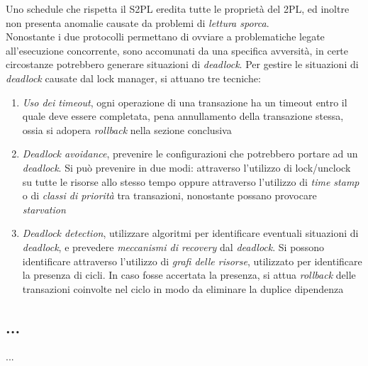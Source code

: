 \documentclass{article}
\begin{document}
Uno schedule che rispetta il S2PL eredita tutte le proprietà del 2PL, ed inoltre non presenta anomalie causate da problemi di \textit{lettura sporca}.\vspace{14pt}\\
Nonostante i due protocolli permettano di ovviare a problematiche legate all'esecuzione concorrente, sono accomunati da una specifica avversità, in certe circostanze potrebbero generare situazioni di \textit{deadlock}. Per gestire le situazioni di \textit{deadlock} causate dal lock manager, si attuano tre tecniche:
\begin{enumerate}[label={-}]
    \item \textit{Uso dei timeout}, ogni operazione di una transazione ha un timeout entro il quale deve essere completata, pena annullamento della transazione stessa, ossia si adopera \textit{rollback} nella sezione conclusiva
    \item \textit{Deadlock avoidance}, prevenire le configurazioni che potrebbero portare ad un \textit{deadlock}. Si può prevenire in due modi: attraverso l'utilizzo di lock/unclock su tutte le risorse allo stesso tempo oppure attraverso l'utilizzo di \textit{time stamp} o di \textit{classi di priorità} tra transazioni, nonostante possano provocare \textit{starvation}
    \item \textit{Deadlock detection}, utilizzare algoritmi per identificare eventuali situazioni di \textit{deadlock}, e prevedere \textit{meccanismi di recovery} dal \textit{deadlock}. Si possono identificare attraverso l'utilizzo di \textit{grafi delle risorse}, utilizzato per identificare la presenza di cicli. In caso fosse accertata la presenza, si attua \textit{rollback} delle transazioni coinvolte nel ciclo in modo da eliminare la duplice dipendenza
\end{enumerate}

\subsection*{...}
\large
...
\end{document}

